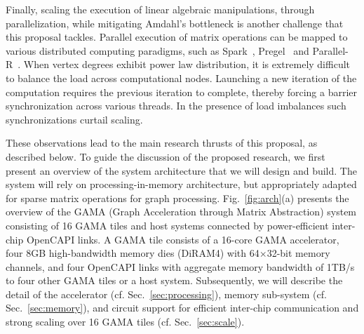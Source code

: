  
Finally, scaling the execution of linear algebraic manipulations, through parallelization, while mitigating Amdahl's bottleneck is another challenge that this proposal tackles. 
Parallel execution of matrix operations can be mapped to various distributed computing paradigms, such as Spark~\cite{zaharia2010spark, MapReduce}, Pregel~\cite{pregel, Giraph} and Parallel-R~\cite{kabacoff2015r}. 
When vertex degrees exhibit power law distribution, it is extremely difficult to balance the load across computational nodes. 
Launching a new iteration of the computation requires the previous iteration to complete, thereby forcing a barrier synchronization across various threads. 
In the presence of load imbalances such synchronizations curtail scaling. 


These observations lead to the main research thrusts of this proposal, as described below. 
To guide the discussion of the proposed research, we first present an overview of the system architecture that we will design and build. 
The system will rely on processing-in-memory architecture, but appropriately adapted for sparse matrix operations for graph processing. 
Fig.~\ref{fig:arch}(a) presents the overview of the GAMA (Graph Acceleration through Matrix Abstraction) system consisting of 16 GAMA tiles and host systems connected by power-efficient inter-chip OpenCAPI links.
A GAMA tile consists of a 16-core GAMA accelerator, four 8GB high-bandwidth memory dies (DiRAM4) with 64$\times$32-bit memory channels, 
and four OpenCAPI links with aggregate memory bandwidth of 1TB/s to four other GAMA tiles or a host system.
Subsequently, we will describe the detail of the accelerator (cf. Sec.~\ref{sec:processing}),  memory sub-system (cf. Sec.~\ref{sec:memory}), and circuit support for efficient inter-chip communication and strong scaling over 16 GAMA tiles (cf. Sec.~\ref{sec:scale}).


